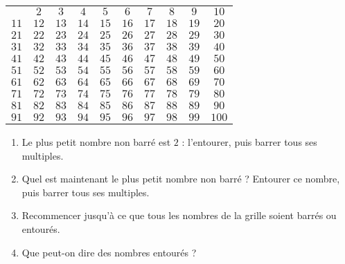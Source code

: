 \documentclass[a4paper]{article}
\begin{document}
\begin{center}
\Large
\begin{tabular}{@{}|c|c|c|c|c|c|c|c|c|c|@{}}
  \toprule
   & $2$ & $3$ & $4$ & $5$ & $6$ & $7$ & $8$ & $9$ & $10$\\
  $11$ & $12$ & $13$ & $14$ & $15$ & $16$ & $17$ & $18$ & $19$ & $20$\\
  $21$ & $22$ & $23$ & $24$ & $25$ & $26$ & $27$ & $28$ & $29$ & $30$\\
  $31$ & $32$ & $33$ & $34$ & $35$ & $36$ & $37$ & $38$ & $39$ & $40$\\
  $41$ & $42$ & $43$ & $44$ & $45$ & $46$ & $47$ & $48$ & $49$ & $50$\\
  $51$ & $52$ & $53$ & $54$ & $55$ & $56$ & $57$ & $58$ & $59$ & $60$\\
  $61$ & $62$ & $63$ & $64$ & $65$ & $66$ & $67$ & $68$ & $69$ & $70$\\
  $71$ & $72$ & $73$ & $74$ & $75$ & $76$ & $77$ & $78$ & $79$ & $80$\\
  $81$ & $82$ & $83$ & $84$ & $85$ & $86$ & $87$ & $88$ & $89$ & $90$\\
  $91$ & $92$ & $93$ & $94$ & $95$ & $96$ & $97$ & $98$ & $99$ & $100$\\
  \bottomrule
\end{tabular}
\end{center}

\begin{enumerate}
  \item Le plus petit nombre non barré est $2$ : l'entourer, puis barrer tous ses multiples.
  \item Quel est maintenant le plus petit nombre non barré ? Entourer ce nombre, puis barrer tous ses multiples.
  \item Recommencer jusqu'à ce que tous les nombres de la grille soient barrés ou entourés.
  \item Que peut-on dire des nombres entourés ?
\end{enumerate}
\end{document}
